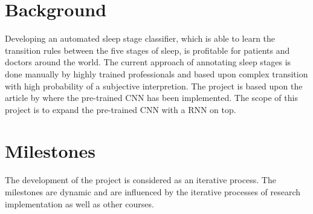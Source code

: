 \documentclass[11pt]{article}
\begin{document}
\section*{Background}
Developing an automated sleep stage classifier, which is able to learn the transition rules between the five stages of sleep, is profitable for patients and doctors around the world. 
The current approach of annotating sleep stages is done manually by highly trained professionals and based upon complex transition with high probability of a subjective interpretion.
The project is based upon the article  by \citeauthor{main_ar} where the pre-trained CNN has been implemented. The scope of this project is to expand the pre-trained CNN with a RNN on top. 





%
%
%



%
%
%
%
%
%
%
%
%
%
%


\section*{Milestones}
The development of the project is considered as an iterative process. The milestones are dynamic and are influenced by the iterative processes of research implementation as well as other courses.
\end{document}
